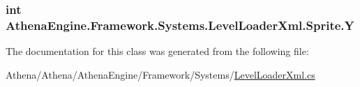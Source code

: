 \hypertarget{class_athena_engine_1_1_framework_1_1_systems_1_1_level_loader_xml_1_1_sprite_ad28706ca852f07c843dc69f813e131e8}{
\subsubsection[{Y}]{\setlength{\rightskip}{0pt plus 5cm}int Athena\-Engine.\-Framework.\-Systems.\-Level\-Loader\-Xml.\-Sprite.\-Y}}\label{class_athena_engine_1_1_framework_1_1_systems_1_1_level_loader_xml_1_1_sprite_ad28706ca852f07c843dc69f813e131e8}


The documentation for this class was generated from the following file\-:\begin{DoxyCompactItemize}
\item 
Athena/\-Athena/\-Athena\-Engine/\-Framework/\-Systems/\hyperlink{_level_loader_xml_8cs}{Level\-Loader\-Xml.\-cs}\end{DoxyCompactItemize}
